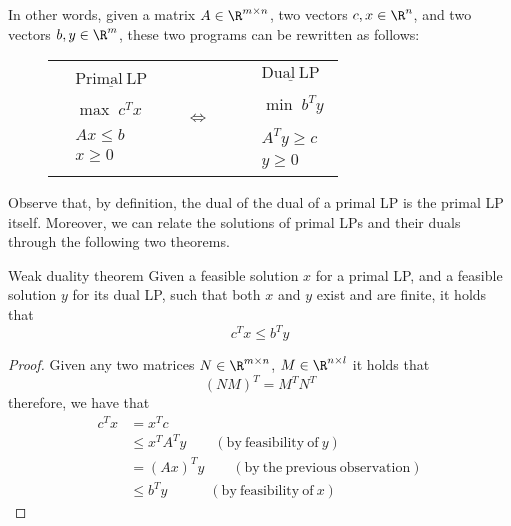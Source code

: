 \documentclass[a4paper, 12pt]{report}
\begin{document}
    In other words, given a matrix $A \in \R^{m \times n}$, two vectors $c, x \in \R^n$, and two vectors $b, y \in \R^m$, these two programs can be rewritten as follows:
     \begin{figure}[H]
        \centering

        \begin{tabular}{ccccc}
            $\begin{array}{cc}
                & \mathrm{\underline{Primal \ LP}} \\\\
                & \max \; c^Tx \\\\
                & Ax \le b \\
                & x \ge 0
            \end{array}
            $

            &\qquad& $\iff$ &\qquad&

            $
            \begin{array}{cc}
                & \mathrm{\underline{Dual \ LP}} \\\\
                & \min \; b^Ty \\\\
                & A^Ty \ge c \\
                & y \ge 0
            \end{array}
            $
        \end{tabular}
    \end{figure}

    Observe that, by definition, the dual of the dual of a primal LP is the primal LP itself. Moreover, we can relate the solutions of primal LPs and their duals through the following two theorems.

    \begin{framedthm}{Weak duality theorem}
        Given a feasible solution $x$ for a primal LP, and a feasible solution $y$ for its dual LP, such that both $x$ and $y$ exist and are finite, it holds that $$c^T x \le b^T y$$
    \end{framedthm}

    \begin{proof}
        Given any two matrices $N \in \R^{m \times n}$, $M \in \R^{n \times l}$ it holds that $$(NM)^T = M^TN^T$$ therefore, we have that
        \begin{equation*}
            \begin{split}
                c^Tx &= x^Tc \\
                     &\le x^TA^Ty \quad \quad (\mathrm{by \ feasibility \ of} \ y) \\
                     &= (Ax)^Ty \quad \quad (\mathrm{by \ the \ previous \ observation}) \\
                     &\le b^Ty \quad \quad \quad (\mathrm{by \ feasibility \ of} \ x)
            \end{split}
        \end{equation*}
    \end{proof}
\end{document}
